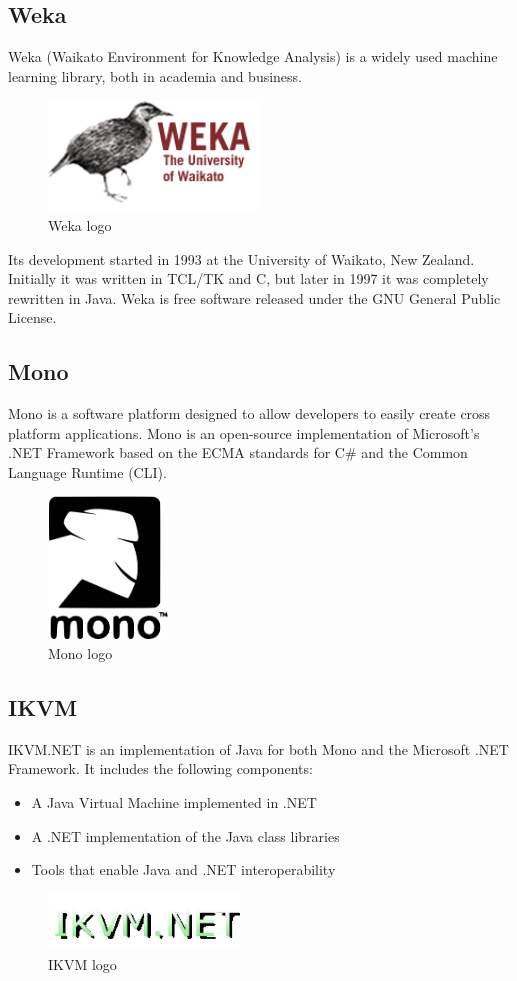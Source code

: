 \documentclass[journal]{IEEEtran/IEEEtran}
\newcommand\subsect[1]{\subsection{#1}\noindent}
\begin{document}
\subsect{Weka}Weka (Waikato Environment for Knowledge Analysis) is a widely used machine learning library, both in academia and business. 
\begin{figure}[H]
\centering
\includegraphics[width=2.2in]{weka}
\caption{Weka logo}
\label{fig_sim}
\end{figure}
Its development started in 1993 at the University of Waikato, New Zealand. Initially it was written in TCL/TK and C, but later in 1997 it was completely rewritten in Java. Weka is free software released under the GNU General Public License.


\subsect{Mono}Mono is a software platform designed to allow developers to easily create cross platform applications. Mono is an open-source implementation of Microsoft's .NET Framework based on the ECMA standards for C\# and the Common Language Runtime (CLI).
\begin{figure}[H]
\centering
\includegraphics[width=1.25in]{Mono}
\caption{Mono logo}
\label{fig_sim}
\end{figure}

\subsect{IKVM}IKVM.NET is an implementation of Java for both Mono and the Microsoft .NET Framework. It includes the following components:
\begin{itemize}
\item A Java Virtual Machine implemented in .NET
\item A .NET implementation of the Java class libraries
\item Tools that enable Java and .NET interoperability
\end{itemize}
\begin{figure}[H]
\centering
\includegraphics[width=2in]{IKVM}
\caption{IKVM logo}
\label{fig_sim}
\end{figure}
\end{document}
